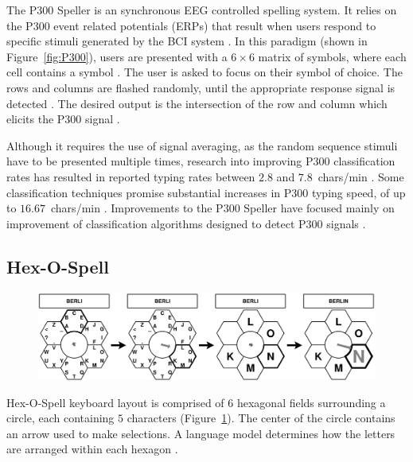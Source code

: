 \documentclass[12pt,titlepage]{article}
\begin{document}
The P300 Speller is an synchronous EEG controlled spelling system.   It relies on the P300 event 
related potentials (ERPs) that result when users respond to specific stimuli generated by the BCI 
system \cite{sellers_p300-based_2006}.  In this paradigm (shown in Figure~\ref{fig:P300}), users are presented with a $6\times6$ matrix of symbols, where 
each cell contains a symbol \cite{sellers_p300-based_2006}.  The user is asked to focus on their symbol of choice.  The rows and 
columns are flashed randomly, until the appropriate response signal is detected \cite{sellers_p300-based_2006}.  The desired output
is the intersection of the row and column which elicits the P300 signal \cite{sellers_p300-based_2006}.

Although it requires the use of signal averaging, as the random sequence stimuli have to be presented 
multiple times, research into improving P300 classification rates has resulted in reported typing rates 
between $2.8$ and $7.8$~chars/min \cite{sellers_braincomputer_2004}.  Some classification techniques promise substantial increases in 
P300 typing speed, of up to $16.67$~chars/min \cite{wolpaw_braincomputer_2002}.  Improvements to the P300 Speller have focused mainly on improvement of classification algorithms designed to detect P300 signals \cite{krusienski2006comparison} \cite{wolpaw_braincomputer_2002} \cite{sellers_braincomputer_2004}.

\subsection{Hex-O-Spell}

\begin{figure}[t]
\begin{center}
	\includegraphics[scale=0.10]{figure3.jpeg}
	\label{fig:Hex}
\end{center}
\end{figure}

Hex-O-Spell keyboard layout is comprised of $6$ hexagonal fields surrounding a circle, each containing 
$5$ characters (Figure~\ref{fig:Hex}).  The center of the circle contains an arrow used to make selections.  A language 
model determines how the letters are arranged within each hexagon \cite{blankertz_berlin_2006}.
\end{document}
